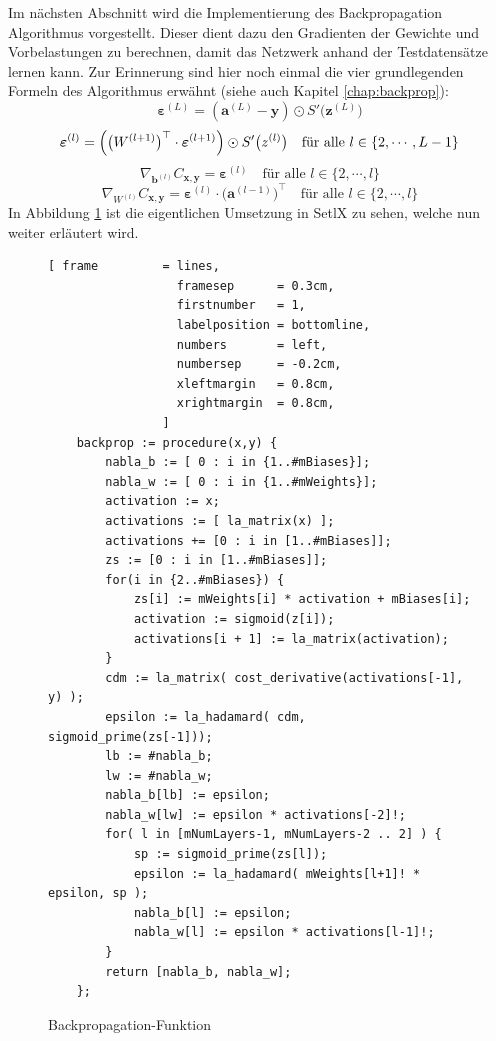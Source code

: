 \noindent
Im nächsten Abschnitt wird die Implementierung des Backpropagation Algorithmus vorgestellt. Dieser dient dazu den Gradienten der Gewichte und Vorbelastungen zu berechnen, damit das Netzwerk anhand der Testdatensätze lernen kann. Zur Erinnerung sind hier noch einmal die vier grundlegenden Formeln des Algorithmus erwähnt (siehe auch Kapitel \ref{chap:backprop}):
\begin{equation} \label{eq:BP1_impl}
	\boldsymbol{\varepsilon}^{(L)} = (\mathbf{a}^{(L)} - \mathbf{y}) \odot S'\bigl(\mathbf{z}^{(L)}\bigr)  
\end{equation}
\begin{equation} \label{eq:BP2_impl}
	\boldsymbol{\varepsilon}^{(l)} = \Bigl(\bigl(W^{(l+1)}\bigr)^\top \cdot \boldsymbol{\varepsilon}^{(l+1)}\Bigr) \odot
  S'\bigl(z^{(l)}\bigr) \quad \mbox{für alle $l \in \{2, \cdots, L-1\}$}
\end{equation}
\begin{equation} \label{eq:BP3_impl}
	\nabla_{\mathbf{b}^{(l)}} C_{\mathbf{x}, \mathbf{y}} = \boldsymbol{\varepsilon}^{(l)}
  \quad \mbox{für alle $l \in \{2, \cdots,l\}$}
\end{equation}
\begin{equation} \label{eq:BP4_impl}
	\nabla_{W^{(l)}} C_{\mathbf{x}, \mathbf{y}} = \boldsymbol{\varepsilon}^{(l)} \cdot \bigl(\mathbf{a}^{(l-1)}\bigr)^\top
  \quad \mbox{für alle $l \in \{2, \cdots,l\}$}
\end{equation}
In Abbildung \ref{fig:backprop_func} ist die eigentlichen Umsetzung in SetlX zu sehen, welche nun weiter erläutert wird.
\begin{figure}
\begin{Verbatim}[ frame         = lines, 
                  framesep      = 0.3cm, 
                  firstnumber   = 1,
                  labelposition = bottomline,
                  numbers       = left,
                  numbersep     = -0.2cm,
                  xleftmargin   = 0.8cm,
                  xrightmargin  = 0.8cm,
                ]
    backprop := procedure(x,y) {
        nabla_b := [ 0 : i in {1..#mBiases}];
        nabla_w := [ 0 : i in {1..#mWeights}];
        activation := x;
        activations := [ la_matrix(x) ];
        activations += [0 : i in [1..#mBiases]];
        zs := [0 : i in [1..#mBiases]];		
        for(i in {2..#mBiases}) {
            zs[i] := mWeights[i] * activation + mBiases[i];	
            activation := sigmoid(z[i]);
            activations[i + 1] := la_matrix(activation);
        }
        cdm := la_matrix( cost_derivative(activations[-1], y) );
        epsilon := la_hadamard( cdm, sigmoid_prime(zs[-1]));
        lb := #nabla_b;
        lw := #nabla_w;
        nabla_b[lb] := epsilon;	
        nabla_w[lw] := epsilon * activations[-2]!;				
        for( l in [mNumLayers-1, mNumLayers-2 .. 2] ) {
            sp := sigmoid_prime(zs[l]);
            epsilon := la_hadamard( mWeights[l+1]! * epsilon, sp );
            nabla_b[l] := epsilon;
            nabla_w[l] := epsilon * activations[l-1]!;
        }
        return [nabla_b, nabla_w];
    };
\end{Verbatim}
\vspace*{-0.3cm}
\caption{Backpropagation-Funktion}
\label{fig:backprop_func}
\end{figure}
